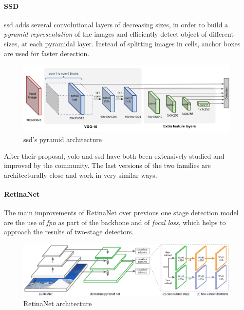 \documentclass[%
    corpo=12pt,
    twoside,
    stile=classica,   
    tipotesi=magistrale,
    evenboxes,
    english,
	numerazioneromana,
]{toptesi}
\begin{document}
\paragraph{SSD}
\acrfull{ssd}\cite{Liu_2016} adds several convolutional layers of decreasing sizes, in order to build a \textit{pyramid representation} of the images and efficiently detect object of different sizes, at each pyramidal layer. Instead of splitting images in cells, anchor boxes are used for faster detection.

\begin{figure}
	\centering
	\includegraphics[width=.9\linewidth]{imgs/SSD-architecture.png}
	\caption{\acrshort{ssd}'s pyramid architecture\cite{objdetpart4}}
	\label{fig:ssd}
\end{figure}

After their proposal, \gls{yolo} and \gls{ssd} have both been extensively studied and improved by the community. The last versions of the two families are architecturally close and work in very similar ways.

\paragraph{RetinaNet}
The main improvements of RetinaNet\cite{lin2018focal} over previous one stage detection model are the use of \textit{\acrfull{fpn}} as part of the backbone and of \textit{focal loss}, which helps to approach the results of two-stage detectors.

\begin{figure}[b]
	\centering
	\includegraphics[width=\linewidth]{imgs/retinanet.png}
	\caption{RetinaNet architecture\cite{lin2018focal}}
	\label{fig:retinanet}
\end{figure}
\end{document}
